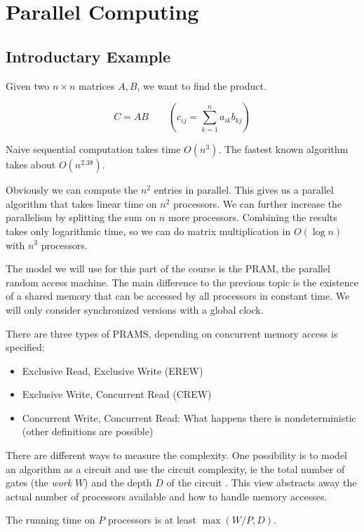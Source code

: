 \chapter{Parallel Computing}

\section{Introductary Example}

Given two $n\times n$ matrices $A,B$, we want to find the product.

\[C=AB \qquad (c_{ij} = \sum_{k=1}^n a_{ik} b_{kj})\]

Naive sequential computation takes time $O(n^3)$. The fastest known algorithm takes about $O(n^{2.38})$.

Obviously we can compute the $n^2$ entries in parallel. This gives us a parallel algorithm that takes linear time on $n^2$ processors. We can further increase the parallelism by splitting the sum on $n$ more processors. Combining the results takes only logarithmic time, so we can do matrix multiplication in $O(\log n)$ with $n^3$ processors.

The model we will use for this part of the course is the PRAM, the parallel random access machine. The main difference to the previous topic is the existence of a shared memory that can be accessed by all processors in constant time. We will only consider synchronized versions with a global clock.

There are three types of PRAMS, depending on concurrent memory access is specified:

\begin{itemize}
\item Exclusive Read, Exclusive Write (EREW)
\item Exclusive Write, Concurrent Read (CREW)
\item Concurrent Write, Concurrent Read: What happens there is nondeterministic (other definitions are possible)
\end{itemize}

There are different ways to measure the complexity. One possibility is to model an algorithm as a circuit and use the circuit complexity, ie the total number of gates (the \emph{work} $W$) and the depth $D$ of the circuit . This view abstracts away the actual number of processors available and how to handle memory accesses. 

The running time on $P$ processors is at least $\max(W/P,D)$. 

